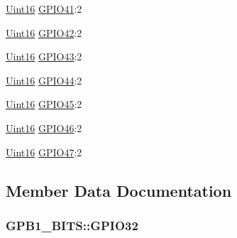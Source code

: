 \begin{DoxyCompactItemize}
\item 
\hyperlink{_d_s_p2833x___device_8h_a59a9f6be4562c327cbfb4f7e8e18f08b}{Uint16} \hyperlink{struct_g_p_b1___b_i_t_s_a14351fc83cd2bf4b86031e05d2ad5b84}{G\+P\+I\+O41}\+:2
\item 
\hyperlink{_d_s_p2833x___device_8h_a59a9f6be4562c327cbfb4f7e8e18f08b}{Uint16} \hyperlink{struct_g_p_b1___b_i_t_s_a5bba72b6563442f79dd2bb6b7ef2f053}{G\+P\+I\+O42}\+:2
\item 
\hyperlink{_d_s_p2833x___device_8h_a59a9f6be4562c327cbfb4f7e8e18f08b}{Uint16} \hyperlink{struct_g_p_b1___b_i_t_s_a249ba15ec2d1790737075724124f28c6}{G\+P\+I\+O43}\+:2
\item 
\hyperlink{_d_s_p2833x___device_8h_a59a9f6be4562c327cbfb4f7e8e18f08b}{Uint16} \hyperlink{struct_g_p_b1___b_i_t_s_ac3d3bf632ae12b2e4b23104762297163}{G\+P\+I\+O44}\+:2
\item 
\hyperlink{_d_s_p2833x___device_8h_a59a9f6be4562c327cbfb4f7e8e18f08b}{Uint16} \hyperlink{struct_g_p_b1___b_i_t_s_a8a89504d2694b3eac337568a68fbde86}{G\+P\+I\+O45}\+:2
\item 
\hyperlink{_d_s_p2833x___device_8h_a59a9f6be4562c327cbfb4f7e8e18f08b}{Uint16} \hyperlink{struct_g_p_b1___b_i_t_s_ac5c6bc9c79b30147415cee61cdd6f50f}{G\+P\+I\+O46}\+:2
\item 
\hyperlink{_d_s_p2833x___device_8h_a59a9f6be4562c327cbfb4f7e8e18f08b}{Uint16} \hyperlink{struct_g_p_b1___b_i_t_s_aefde0c00268f0710ed2af0a29f14e49b}{G\+P\+I\+O47}\+:2
\end{DoxyCompactItemize}


\subsection{Member Data Documentation}
\hypertarget{struct_g_p_b1___b_i_t_s_a0be945b42bc0eae583a0be722112affa}{}
\subsubsection[{G\+P\+I\+O32}]{ G\+P\+B1\+\_\+\+B\+I\+T\+S\+::\+G\+P\+I\+O32}\label{struct_g_p_b1___b_i_t_s_a0be945b42bc0eae583a0be722112affa}
\hypertarget{struct_g_p_b1___b_i_t_s_a58a9e510ee748bd3e012e27e034fcc88}{}

